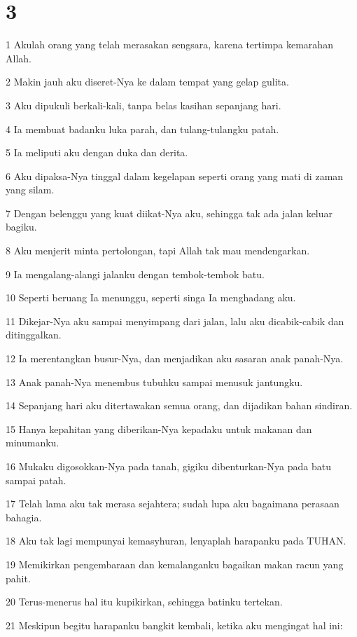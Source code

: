 \chapter{3}

\par 1 Akulah orang yang telah merasakan sengsara, karena tertimpa kemarahan Allah.
\par 2 Makin jauh aku diseret-Nya ke dalam tempat yang gelap gulita.
\par 3 Aku dipukuli berkali-kali, tanpa belas kasihan sepanjang hari.
\par 4 Ia membuat badanku luka parah, dan tulang-tulangku patah.
\par 5 Ia meliputi aku dengan duka dan derita.
\par 6 Aku dipaksa-Nya tinggal dalam kegelapan seperti orang yang mati di zaman yang silam.
\par 7 Dengan belenggu yang kuat diikat-Nya aku, sehingga tak ada jalan keluar bagiku.
\par 8 Aku menjerit minta pertolongan, tapi Allah tak mau mendengarkan.
\par 9 Ia mengalang-alangi jalanku dengan tembok-tembok batu.
\par 10 Seperti beruang Ia menunggu, seperti singa Ia menghadang aku.
\par 11 Dikejar-Nya aku sampai menyimpang dari jalan, lalu aku dicabik-cabik dan ditinggalkan.
\par 12 Ia merentangkan busur-Nya, dan menjadikan aku sasaran anak panah-Nya.
\par 13 Anak panah-Nya menembus tubuhku sampai menusuk jantungku.
\par 14 Sepanjang hari aku ditertawakan semua orang, dan dijadikan bahan sindiran.
\par 15 Hanya kepahitan yang diberikan-Nya kepadaku untuk makanan dan minumanku.
\par 16 Mukaku digosokkan-Nya pada tanah, gigiku dibenturkan-Nya pada batu sampai patah.
\par 17 Telah lama aku tak merasa sejahtera; sudah lupa aku bagaimana perasaan bahagia.
\par 18 Aku tak lagi mempunyai kemasyhuran, lenyaplah harapanku pada TUHAN.
\par 19 Memikirkan pengembaraan dan kemalanganku bagaikan makan racun yang pahit.
\par 20 Terus-menerus hal itu kupikirkan, sehingga batinku tertekan.
\par 21 Meskipun begitu harapanku bangkit kembali, ketika aku mengingat hal ini:
